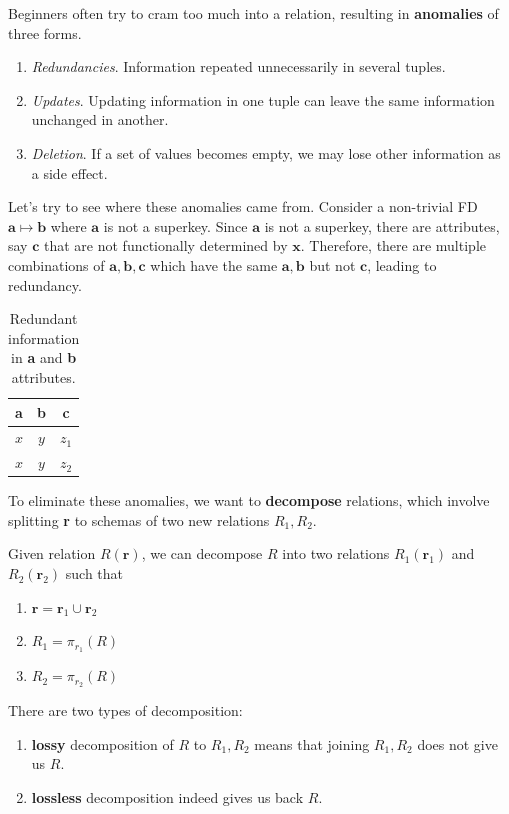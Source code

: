 \documentclass{article}
\begin{document}
    \begin{definition}[Anomaly]
      Beginners often try to cram too much into a relation, resulting in \textbf{anomalies} of three forms. 
      \begin{enumerate}
        \item \textit{Redundancies}. Information repeated unnecessarily in several tuples. 
        \item \textit{Updates}. Updating information in one tuple can leave the same information unchanged in another. 
        \item \textit{Deletion}. If a set of values becomes empty, we may lose other information as a side effect. 
      \end{enumerate}
    \end{definition}

    Let's try to see where these anomalies came from. Consider a non-trivial FD $\mathbf{a} \mapsto \mathbf{b}$ where $\mathbf{a}$ is not a superkey. Since $\mathbf{a}$ is not a superkey, there are attributes, say $\mathbf{c}$ that are not functionally determined by $\mathbf{x}$. Therefore, there are multiple combinations of $\mathbf{a, b, c}$ which have the same $\mathbf{a, b}$ but not $\mathbf{c}$, leading to redundancy. 

    \begin{table}[H]
      \centering
      \begin{tabular}{|c|c|c|}
        \hline
        \textbf{a} & \textbf{b} & \textbf{c} \\
        \hline
        $x$ & $y$ & $z_1$ \\ 
        $x$ & $y$ & $z_2$ \\
        \hline
      \end{tabular}
      \caption{Redundant information in \textbf{a} and \textbf{b} attributes. }
      \label{tab:redundant}
    \end{table}

    To eliminate these anomalies, we want to \textbf{decompose} relations, which involve splitting \textbf{r} to schemas of two new relations $R_1, R_2$. 

    \begin{definition}[Decomposition]
      Given relation $R(\mathbf{r})$, we can decompose $R$ into two relations $R_1 (\mathbf{r}_1)$ and $R_2 (\mathbf{r}_2)$ such that 
      \begin{enumerate}
        \item $\mathbf{r} = \mathbf{r}_1 \cup \mathbf{r}_2$ 
        \item $R_1 = \pi_{r_1} (R)$
        \item $R_2 = \pi_{r_2} (R)$
      \end{enumerate}
      There are two types of decomposition: 
      \begin{enumerate}
        \item \textbf{lossy} decomposition of $R$ to $R_1, R_2$ means that joining $R_1, R_2$ does not give us $R$. 
        \item \textbf{lossless} decomposition indeed gives us back $R$. 
      \end{enumerate}
    \end{definition}
\end{document}

